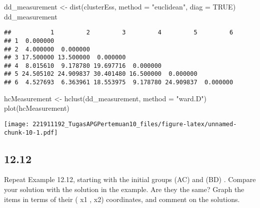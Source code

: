 \documentclass[
]{article}
\newenvironment{Shaded}{\begin{snugshade}}{\end{snugshade}}
\newcommand{\AttributeTok}[1]{\textcolor[rgb]{0.77,0.63,0.00}{#1}}
\newcommand{\ConstantTok}[1]{\textcolor[rgb]{0.00,0.00,0.00}{#1}}
\newcommand{\FunctionTok}[1]{\textcolor[rgb]{0.00,0.00,0.00}{#1}}
\newcommand{\NormalTok}[1]{#1}
\newcommand{\OtherTok}[1]{\textcolor[rgb]{0.56,0.35,0.01}{#1}}
\newcommand{\StringTok}[1]{\textcolor[rgb]{0.31,0.60,0.02}{#1}}
\begin{document}
\begin{Shaded}
\begin{Highlighting}[]
\NormalTok{dd\_measurement }\OtherTok{\textless{}{-}} \FunctionTok{dist}\NormalTok{(clusterEss, }\AttributeTok{method =} \StringTok{"euclidean"}\NormalTok{, }\AttributeTok{diag =} \ConstantTok{TRUE}\NormalTok{)}
\NormalTok{dd\_measurement}
\end{Highlighting}
\end{Shaded}

\begin{verbatim}
##           1         2         3         4         5         6
## 1  0.000000                                                  
## 2  4.000000  0.000000                                        
## 3 17.500000 13.500000  0.000000                              
## 4  8.015610  9.178780 19.697716  0.000000                    
## 5 24.505102 24.909837 30.401480 16.500000  0.000000          
## 6  4.527693  6.363961 18.553975  9.178780 24.909837  0.000000
\end{verbatim}

\begin{Shaded}
\begin{Highlighting}[]
\NormalTok{hcMeasurement }\OtherTok{\textless{}{-}} \FunctionTok{hclust}\NormalTok{(dd\_measurement, }\AttributeTok{method =} \StringTok{"ward.D"}\NormalTok{)}
\FunctionTok{plot}\NormalTok{(hcMeasurement)}
\end{Highlighting}
\end{Shaded}

\texttt{[image: 221911192\_TugasAPGPertemuan10\_files/figure-latex/unnamed-chunk-10-1.pdf]}

\hypertarget{section-1}{%
\subsection{12.12}\label{section-1}}

Repeat Example 12.12, starting with the initial groups (AC) and (BD) .
Compare your solution with the solution in the example. Are they the
same? Graph the items in terms of their ( x1 , x2) coordinates, and
comment on the solutions.
\end{document}
